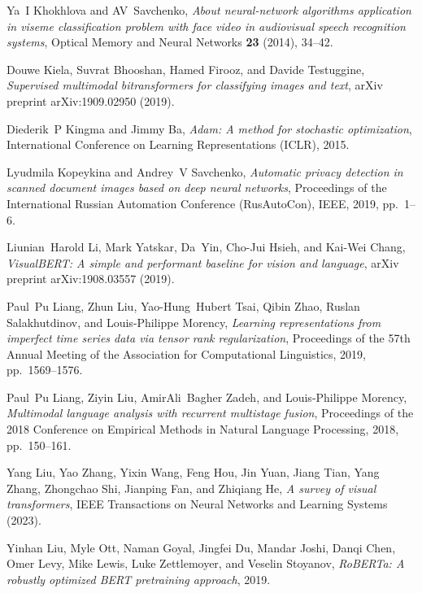\documentclass{zapiski}
\begin{document}
\begin{thebibliography}{10}
Ya~I Khokhlova and AV~Savchenko, \emph{About neural-network algorithms
  application in viseme classification problem with face video in audiovisual
  speech recognition systems}, Optical Memory and Neural Networks \textbf{23}
  (2014), 34--42.

Douwe Kiela, Suvrat Bhooshan, Hamed Firooz, and Davide Testuggine,
  \emph{Supervised multimodal bitransformers for classifying images and text},
  arXiv preprint arXiv:1909.02950 (2019).

Diederik~P Kingma and Jimmy Ba, \emph{Adam: A method for stochastic
  optimization}, International Conference on Learning Representations (ICLR),
  2015.

Lyudmila Kopeykina and Andrey~V Savchenko, \emph{Automatic privacy detection in
  scanned document images based on deep neural networks}, Proceedings of the
  International Russian Automation Conference (RusAutoCon), IEEE, 2019,
  pp.~1--6.

Liunian~Harold Li, Mark Yatskar, Da~Yin, Cho-Jui Hsieh, and Kai-Wei Chang,
  \emph{Visual{BERT}: A simple and performant baseline for vision and
  language}, arXiv preprint arXiv:1908.03557 (2019).

Paul~Pu Liang, Zhun Liu, Yao-Hung~Hubert Tsai, Qibin Zhao, Ruslan
  Salakhutdinov, and Louis-Philippe Morency, \emph{Learning representations
  from imperfect time series data via tensor rank regularization}, Proceedings
  of the 57th Annual Meeting of the Association for Computational Linguistics,
  2019, pp.~1569--1576.

Paul~Pu Liang, Ziyin Liu, AmirAli~Bagher Zadeh, and Louis-Philippe Morency,
  \emph{Multimodal language analysis with recurrent multistage fusion},
  Proceedings of the 2018 Conference on Empirical Methods in Natural Language
  Processing, 2018, pp.~150--161.

Yang Liu, Yao Zhang, Yixin Wang, Feng Hou, Jin Yuan, Jiang Tian, Yang Zhang,
  Zhongchao Shi, Jianping Fan, and Zhiqiang He, \emph{A survey of visual
  transformers}, IEEE Transactions on Neural Networks and Learning Systems
  (2023).

Yinhan Liu, Myle Ott, Naman Goyal, Jingfei Du, Mandar Joshi, Danqi Chen, Omer
  Levy, Mike Lewis, Luke Zettlemoyer, and Veselin Stoyanov, \emph{{RoBERTa}: A
  robustly optimized {BERT} pretraining approach}, 2019.


\end{thebibliography}
\end{document}
